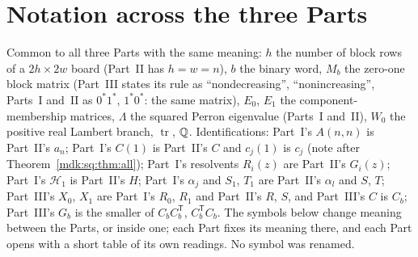 \documentclass[11pt,letterpaper]{article}
\numberwithin{equation}{section}
\theoremstyle{remark}\newtheorem{remark}[theorem]{Remark}
\DeclareMathOperator{\tr}{tr}\DeclareMathOperator{\TV}{TV}
\begin{document}
\section*{Notation across the three Parts}\label{mdk:sec:notation}
Common to all three Parts with the same meaning: $h$ the number of block rows of a $2h\times2w$ board (Part~II has $h=w=n$), $b$ the binary word, $M_b$ the zero-one block matrix (Part~III states its rule as ``nondecreasing'', ``nonincreasing'', Parts~I and~II as $0^*1^*$, $1^*0^*$: the same matrix), $E_0$, $E_1$ the component-membership matrices, $\Lambda$ the squared Perron eigenvalue (Parts~I and~II), $W_0$ the positive real Lambert branch, $\tr$, $\mathbb Q$. Identifications: Part~I's $A(n,n)$ is Part~II's $a_n$; Part~I's $C(1)$ is Part~II's $C$ and $c_j(1)$ is $c_j$ (note after Theorem~\ref{mdk:sq:thm:all}); Part~I's resolvents $R_i(z)$ are Part~II's $G_i(z)$; Part~I's $\mathcal H_1$ is Part~II's $H$; Part~I's $\alpha_j$ and $S_1$, $T_1$ are Part~II's $\alpha_l$ and $S$, $T$; Part~III's $X_0$, $X_1$ are Part~I's $R_0$, $R_1$ and Part~II's $R$, $S$, and Part~III's $C$ is $C_b$; Part~III's $G_b$ is the smaller of $C_bC_b^{\mathsf T}$, $C_b^{\mathsf T}C_b$. The symbols below change meaning between the Parts, or inside one; each Part fixes its meaning there, and each Part opens with a short table of its own readings. No symbol was renamed.
\begingroup\small
\renewcommand{\theHtable}{notation.\arabic{table}}
\end{document}
